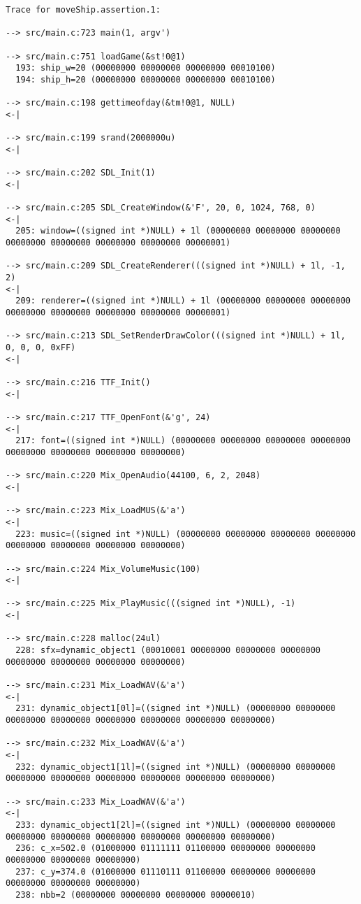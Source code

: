 \begin{verbatim}
Trace for moveShip.assertion.1:

--> src/main.c:723 main(1, argv')

--> src/main.c:751 loadGame(&st!0@1)
  193: ship_w=20 (00000000 00000000 00000000 00010100)
  194: ship_h=20 (00000000 00000000 00000000 00010100)

--> src/main.c:198 gettimeofday(&tm!0@1, NULL)
<-|

--> src/main.c:199 srand(2000000u)
<-|

--> src/main.c:202 SDL_Init(1)
<-|

--> src/main.c:205 SDL_CreateWindow(&'F', 20, 0, 1024, 768, 0)
<-|
  205: window=((signed int *)NULL) + 1l (00000000 00000000 00000000 00000000 00000000 00000000 00000000 00000001)

--> src/main.c:209 SDL_CreateRenderer(((signed int *)NULL) + 1l, -1, 2)
<-|
  209: renderer=((signed int *)NULL) + 1l (00000000 00000000 00000000 00000000 00000000 00000000 00000000 00000001)

--> src/main.c:213 SDL_SetRenderDrawColor(((signed int *)NULL) + 1l, 0, 0, 0, 0xFF)
<-|

--> src/main.c:216 TTF_Init()
<-|

--> src/main.c:217 TTF_OpenFont(&'g', 24)
<-|
  217: font=((signed int *)NULL) (00000000 00000000 00000000 00000000 00000000 00000000 00000000 00000000)

--> src/main.c:220 Mix_OpenAudio(44100, 6, 2, 2048)
<-|

--> src/main.c:223 Mix_LoadMUS(&'a')
<-|
  223: music=((signed int *)NULL) (00000000 00000000 00000000 00000000 00000000 00000000 00000000 00000000)

--> src/main.c:224 Mix_VolumeMusic(100)
<-|

--> src/main.c:225 Mix_PlayMusic(((signed int *)NULL), -1)
<-|

--> src/main.c:228 malloc(24ul)
  228: sfx=dynamic_object1 (00010001 00000000 00000000 00000000 00000000 00000000 00000000 00000000)

--> src/main.c:231 Mix_LoadWAV(&'a')
<-|
  231: dynamic_object1[0l]=((signed int *)NULL) (00000000 00000000 00000000 00000000 00000000 00000000 00000000 00000000)

--> src/main.c:232 Mix_LoadWAV(&'a')
<-|
  232: dynamic_object1[1l]=((signed int *)NULL) (00000000 00000000 00000000 00000000 00000000 00000000 00000000 00000000)

--> src/main.c:233 Mix_LoadWAV(&'a')
<-|
  233: dynamic_object1[2l]=((signed int *)NULL) (00000000 00000000 00000000 00000000 00000000 00000000 00000000 00000000)
  236: c_x=502.0 (01000000 01111111 01100000 00000000 00000000 00000000 00000000 00000000)
  237: c_y=374.0 (01000000 01110111 01100000 00000000 00000000 00000000 00000000 00000000)
  238: nbb=2 (00000000 00000000 00000000 00000010)


\end{verbatim}
